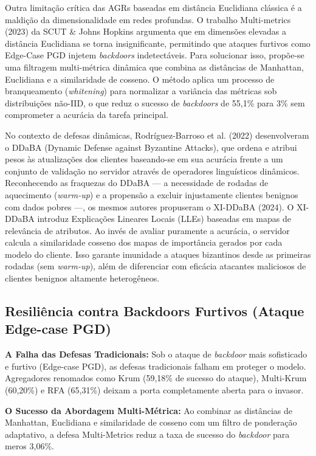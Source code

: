 \documentclass[11pt,a4paper]{article}
\begin{document}
Outra limitação crítica das AGRs baseadas em distância Euclidiana clássica é a maldição da dimensionalidade em redes profundas. O trabalho Multi-metrics (2023) da SCUT \& Johns Hopkins argumenta que em dimensões elevadas a distância Euclidiana se torna insignificante, permitindo que ataques furtivos como Edge-Case PGD injetem \emph{backdoors} indetectáveis. Para solucionar isso, propõe-se uma filtragem multi-métrica dinâmica que combina as distâncias de Manhattan, Euclidiana e a similaridade de cosseno. O método aplica um processo de branqueamento (\emph{whitening}) para normalizar a variância das métricas sob distribuições não-IID, o que reduz o sucesso de \emph{backdoors} de 55,1\% para 3\% sem comprometer a acurácia da tarefa principal.

No contexto de defesas dinâmicas, Rodríguez-Barroso et al. (2022) desenvolveram o DDaBA (Dynamic Defense against Byzantine Attacks), que ordena e atribui pesos às atualizações dos clientes baseando-se em sua acurácia frente a um conjunto de validação no servidor através de operadores linguísticos dinâmicos. Reconhecendo as fraquezas do DDaBA --- a necessidade de rodadas de aquecimento (\emph{warm-up}) e a propensão a excluir injustamente clientes benignos com dados pobres ---, os mesmos autores propuseram o XI-DDaBA (2024). O XI-DDaBA introduz Explicações Lineares Locais (LLEs) baseadas em mapas de relevância de atributos. Ao invés de avaliar puramente a acurácia, o servidor calcula a similaridade cosseno dos mapas de importância gerados por cada modelo do cliente. Isso garante imunidade a ataques bizantinos desde as primeiras rodadas (sem \emph{warm-up}), além de diferenciar com eficácia atacantes maliciosos de clientes benignos altamente heterogêneos.

\subsection{Resiliência contra Backdoors Furtivos (Ataque Edge-case PGD)}
\textbf{A Falha das Defesas Tradicionais:} Sob o ataque de \emph{backdoor} mais sofisticado e furtivo (Edge-case PGD), as defesas tradicionais falham em proteger o modelo. Agregadores renomados como Krum (59,18\% de sucesso do ataque), Multi-Krum (60,20\%) e RFA (65,31\%) deixam a porta completamente aberta para o invasor.

\textbf{O Sucesso da Abordagem Multi-Métrica:} Ao combinar as distâncias de Manhattan, Euclidiana e similaridade de cosseno com um filtro de ponderação adaptativo, a defesa Multi-Metrics reduz a taxa de sucesso do \emph{backdoor} para meros 3,06\%.
\end{document}
